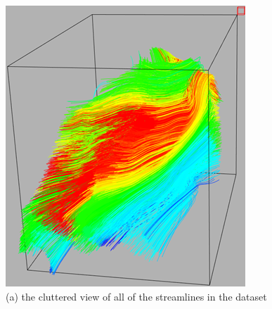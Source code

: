 \documentclass{egpubl}
\begin{document}
\begin{figure}[h]
        \centering
                \begin{minipage}{0.30\linewidth}
               		\small
                       	\includegraphics[height = 1.1\linewidth]{Images/all_vtk.png}\\(a) the cluttered view of all of the streamlines in the dataset\vspace{0.2em}
                \end{minipage}
                \begin{minipage}{0.30\linewidth}
                	\small

\end{minipage}
\end{figure}
\end{document}
